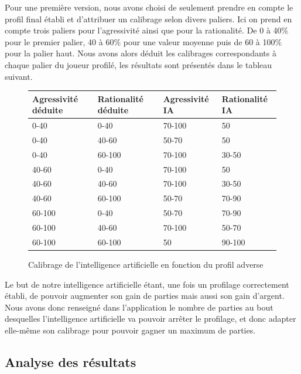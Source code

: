 \documentclass{report}
\begin{document}
\hspace{0.5cm}Pour une première version, nous avons choisi de seulement prendre en compte le profil final établi et d'attribuer un calibrage selon divers paliers. Ici on prend en compte trois paliers pour l'agressivité ainsi que pour la rationalité. De 0 à 40\% pour le premier palier, 40 à 60\% pour une valeur moyenne puis de 60 à 100\% pour la palier haut. Nous avons alors déduit les calibrages correspondants à chaque palier du joueur profilé, les résultats sont présentés dans le tableau suivant.\\
\begin{figure}[H]
\begin{center}
\begin{tabular}{|l|l|l|l|}
\hline
Agressivité déduite & Rationalité déduite &	Agressivité IA & 	Rationalité IA\\
\hline
0-40	 			    & 0-40 				 & 	70-100		   & 50\\
\hline
0-40					&	40-60			 &	50-70		   & 	50\\
\hline
0-40					& 60-100				 &	70-100		   &	30-50\\
\hline
40-60				&	0-40				 &	70-100		   &	50\\
\hline
40-60				&	40-60			&	70-100			&	30-50\\
\hline
40-60				&	60-100			&	50-70			&	70-90\\
\hline
60-100				&	0-40				&	50-70			&	70-90\\
\hline
60-100				&	40-60			&	70-100			&	50-70\\
\hline
60-100				&	60-100			&	50				&	90-100\\
\hline
\end{tabular}
\end{center}
\caption{Calibrage de l'intelligence artificielle en fonction du profil adverse}
\end{figure}


Le but de notre intelligence artificielle étant, une fois un profilage correctement établi, de pouvoir augmenter son gain de parties mais aussi son gain d'argent. Nous avons donc renseigné dans l'application le nombre de parties au bout desquelles l'intelligence artificielle va pouvoir arrêter le profilage, et donc adapter elle-même son calibrage pour pouvoir gagner un maximum de parties.\\

\subsection{Analyse des résultats}
\end{document}

